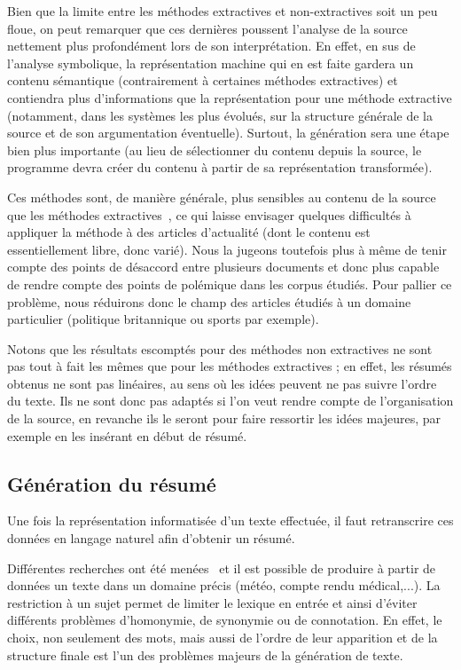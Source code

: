 \documentclass{article}           %
\begin{document}
Bien que la limite entre les méthodes extractives et non-extractives soit un peu floue, on peut remarquer que ces dernières poussent l'analyse de la source nettement plus profondément lors de son interprétation. En effet, en sus de l'analyse symbolique, la représentation machine qui en est faite gardera un contenu sémantique (contrairement à certaines méthodes extractives) et contiendra plus d'informations que la représentation pour une méthode extractive (notamment, dans les systèmes les plus évolués, sur la structure générale de la source et de son argumentation éventuelle). Surtout, la génération sera une étape bien plus importante (au lieu de sélectionner du contenu depuis la source, le programme devra créer du contenu à partir de sa représentation transformée).

Ces méthodes sont, de manière générale, plus sensibles au contenu de la source que les méthodes extractives~\cite[p.1774]{jones_automatic_2007}, ce qui laisse envisager quelques difficultés à appliquer la méthode à des articles d'actualité (dont le contenu est essentiellement libre, donc varié). Nous la jugeons toutefois plus à même de tenir compte des points de désaccord entre plusieurs documents et donc plus capable de rendre compte des points de polémique dans les corpus étudiés. Pour pallier ce problème, nous réduirons donc le champ des articles étudiés à un domaine particulier (politique britannique ou sports par exemple).

Notons que les résultats escomptés pour des méthodes non extractives ne sont pas tout à fait les mêmes que pour les méthodes extractives ; en effet, les résumés obtenus ne sont pas linéaires, au sens où les idées peuvent ne pas suivre l'ordre du texte. Ils ne sont donc pas adaptés si l'on veut rendre compte de l'organisation de la source, en revanche ils le seront pour faire ressortir les idées majeures, par exemple en les insérant en début de résumé.

\subsection{Génération du résumé}
Une fois la représentation informatisée d'un texte effectuée, il faut retranscrire ces données en langage naturel afin d'obtenir un résumé.

Différentes recherches ont été menées~\cite{horacek_building_2001}\cite{laurence_danlos_generation_2000} et il est possible de produire à partir de données un texte dans un domaine précis (météo, compte rendu médical,...). La restriction à un sujet permet de limiter le lexique en entrée et ainsi d'éviter différents problèmes d'homonymie, de synonymie ou de connotation. En effet, le choix, non seulement des mots, mais aussi de l'ordre de leur apparition et de la structure finale est l'un des problèmes majeurs de la génération de texte.
\end{document}
